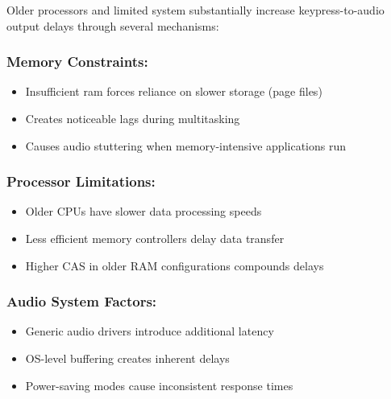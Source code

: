Older processors and limited system  substantially increase keypress-to-audio output delays through several mechanisms:

\subsubsection{Memory Constraints:}

\begin{itemize}
	\item Insufficient \gls{ram} forces reliance on slower storage (page files) \supercite{Microsoft2023WindowsPerformance}
	\item Creates noticeable lags during multitasking \supercite{Intel2024ProcessorMemory}
	\item Causes \gls{audio} stuttering when memory-intensive applications run \supercite{Realtek2023AudioDriverPerformance}
\end{itemize}


\subsubsection{Processor Limitations:}

\begin{itemize}
	\item Older CPUs have slower data processing speeds \supercite{AMD2024RyzenPerformance}
	\item Less efficient memory controllers delay data transfer \supercite{AnandTech2023MemoryControllers}
	\item Higher CAS  in older RAM configurations compounds delays \supercite{TechSpot2023RAMTimings}
\end{itemize}


\subsubsection{Audio System Factors:}

\begin{itemize}
	\item Generic audio drivers introduce additional \gls{latency} \supercite{ASIO4ALL2023Latency}
	\item OS-level buffering creates inherent delays \supercite{LinuxAudioLatency}
	\item Power-saving modes cause inconsistent response times \supercite{WindowsPowerManagement}
\end{itemize}


